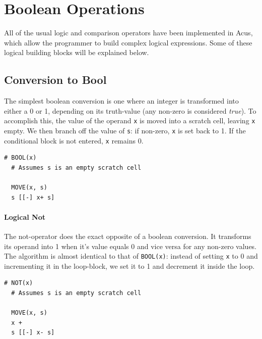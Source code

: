 \section{Boolean Operations}
All of the usual logic and comparison operators have been implemented in Acus, which allow the programmer to build complex logical expressions. Some of these logical building blocks will be explained below.

\subsection{Conversion to Bool}
The simplest boolean conversion is one where an integer is transformed into either a 0 or 1, depending on its truth-value (any non-zero is considered \emph{true}). To accomplish this, the value of the operand \texttt{x} is moved into a scratch cell, leaving \texttt{x} empty. We then branch off the value of \texttt{s}: if non-zero, \texttt{x} is set back to 1. If the conditional block is not entered, \texttt{x} remains 0.

\vspace{0.5cm}\noindent\begin{minipage}{\linewidth}
\begin{lstlisting}[style=brainfuck]
  # BOOL(x)
  # Assumes s is an empty scratch cell
  
  MOVE(x, s)
  s [[-] x+ s]
\end{lstlisting}
\end{minipage}

\paragraph{Logical Not} The not-operator does the exact opposite of a boolean conversion. It transforms its operand into 1 when it's value equals 0 and vice versa for any non-zero values. The algorithm is almost identical to that of \texttt{BOOL(x)}: instead of setting \texttt{x} to 0 and incrementing it in the loop-block, we set it to 1 and decrement it inside the loop.

\vspace{0.5cm}\noindent\begin{minipage}{\linewidth}
\begin{lstlisting}[style=brainfuck]
  # NOT(x)
  # Assumes s is an empty scratch cell
  
  MOVE(x, s)
  x +
  s [[-] x- s]
\end{lstlisting}
\end{minipage}

